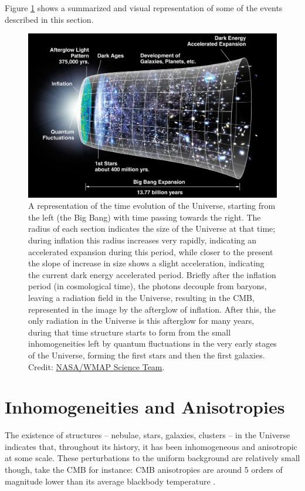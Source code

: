 \documentclass[openany,a4paper,12pt,oneside]{book}
\begin{document}
\begin{spacing}{1.5}
Figure \ref{fig:cosmo_brief_history} shows a summarized and visual representation of some of the events described in this section.

\begin{figure}[!htb]
    \centering
    \includegraphics[width=.9\linewidth]{Imagens/CMB_Timeline300_no_WMAP.jpg}
    \caption{A representation of the time evolution of the Universe, starting from the left (the Big Bang) with time passing towards the right. The radius of each section indicates the size of the Universe at that time; during inflation this radius increases very rapidly, indicating an accelerated expansion during this period, while closer to the present the slope of increase in size shows a slight acceleration, indicating the current dark energy accelerated period. Briefly after the inflation period (in cosmological time), the photons decouple from baryons, leaving a radiation field in the Universe, resulting in the CMB, represented in the image by the afterglow of inflation. After this, the only radiation in the Universe is this afterglow for many years, during that time structure starts to form from the small inhomogeneities left by quantum fluctuations in the very early stages of the Universe, forming the first stars and then the first galaxies. Credit: \href{https://map.gsfc.nasa.gov/media/060915/index.html}{NASA/WMAP Science Team}.}
    \label{fig:cosmo_brief_history}
\end{figure}

\section{Inhomogeneities and Anisotropies}

The existence of structures -- nebulae, stars, galaxies, clusters -- in the Universe indicates that, throughout its history, it has been inhomogeneous and anisotropic at some scale. These perturbations to the uniform background are relatively small though, take the CMB for instance: CMB anisotropies are around 5 orders of magnitude lower than its average blackbody temperature \cite{WMAP_results}. 


\end{spacing}
\end{document}

